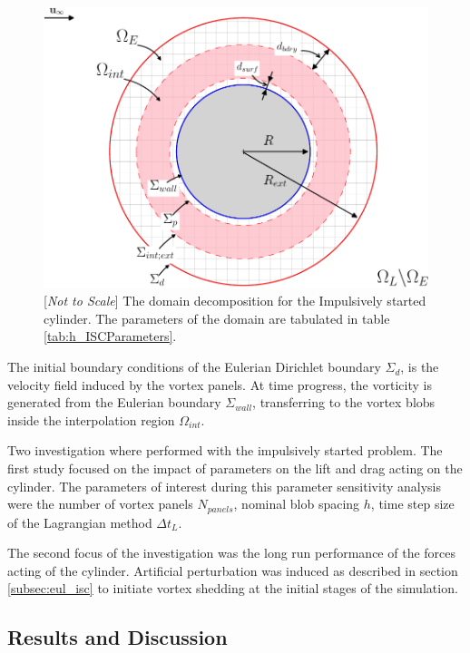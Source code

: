 	\begin{figure}[!h]
	\showthe\columnwidth
	\centering
	\includegraphics[width=0.6\linewidth]{./figures/hybrid/isc/hisc_dd-crop.pdf}
	\caption{[\textit{Not to Scale}] The domain decomposition for the Impulsively started cylinder. The parameters of the domain are tabulated in table \ref{tab:h_ISCParameters}.}
	\label{fig:hisc_dd}
	\end{figure}

The initial boundary conditions of the Eulerian Dirichlet boundary $\Sigma_d$, is the velocity field induced by the vortex panels. At time progress, the vorticity is generated from the Eulerian boundary $\Sigma_{wall}$, transferring to the vortex blobs inside the interpolation region $\Omega_{int}$. 

Two investigation where performed with the impulsively started problem. The first study focused on the impact of parameters on the lift and drag acting on the cylinder. The parameters of interest during this parameter sensitivity analysis were the number of vortex panels $N_{panels}$, nominal blob spacing $h$, time step size of the Lagrangian method $\Delta t_L$.

The second focus of the investigation was the long run performance of the forces acting of the cylinder. Artificial perturbation was induced as described in section \ref{subsec:eul_isc} to initiate vortex shedding at the initial stages of the simulation.

\subsection{Results and Discussion}

